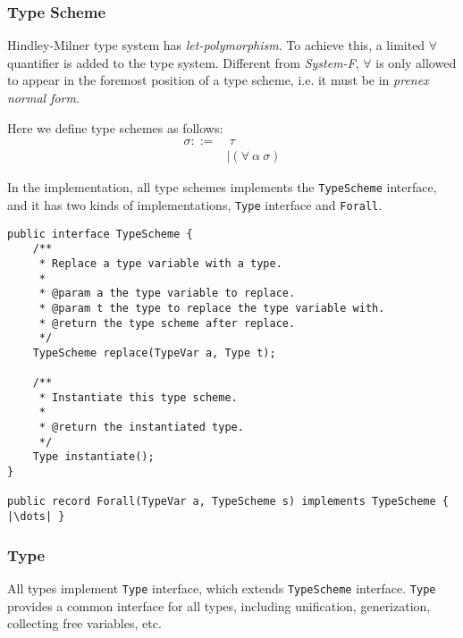 \documentclass[a4paper]{article}
\begin{document}
\subsubsection{Type Scheme}

Hindley-Milner type system has \textit{let-polymorphism}. To achieve this, a limited $\forall$ quantifier is added to the type system. Different from \textit{System-F}, $\forall$ is only allowed to appear in the foremost position of a type scheme, i.e. it must be in \textit{prenex normal form}.

Here we define type schemes as follows:
\begin{align*}
    \sigma ::= & \ \tau                      \\
               & | (\forall\ \alpha\ \sigma)
\end{align*}

In the implementation, all type schemes implements the \texttt{TypeScheme} interface, and
it has two kinds of implementations, \texttt{Type} interface and \texttt{Forall}.
\begin{verbatim}
public interface TypeScheme {
    /**
     * Replace a type variable with a type.
     *
     * @param a the type variable to replace.
     * @param t the type to replace the type variable with.
     * @return the type scheme after replace.
     */
    TypeScheme replace(TypeVar a, Type t);

    /**
     * Instantiate this type scheme.
     *
     * @return the instantiated type.
     */
    Type instantiate();
}

public record Forall(TypeVar a, TypeScheme s) implements TypeScheme { |\dots| }
\end{verbatim}

\subsubsection{Type}

All types implement \texttt{Type} interface, which extends \texttt{TypeScheme} interface. \texttt{Type} provides a common interface for all types, including unification, generization, collecting free variables, etc.
\end{document}
